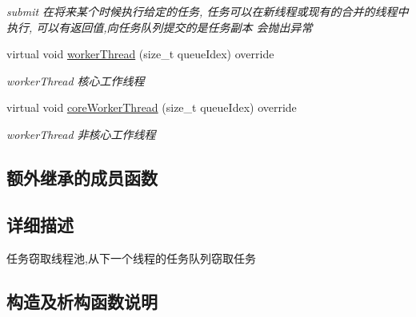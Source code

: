 \begin{DoxyCompactItemize}
\begin{DoxyCompactList}\small\item\em submit 在将来某个时候执行给定的任务, 任务可以在新线程或现有的合并的线程中执行, 可以有返回值,向任务队列提交的是任务副本 会抛出异常 \end{DoxyCompactList}\item 
virtual void \hyperlink{classWorkStealingThreadPoolExecutor_a962c0965822cd961984928ec26d61d4e}{worker\+Thread} (size\+\_\+t queue\+Idex) override
\begin{DoxyCompactList}\small\item\em worker\+Thread 核心工作线程 \end{DoxyCompactList}\item 
virtual void \hyperlink{classWorkStealingThreadPoolExecutor_a9a9ad791af26c0809a9e1864544930aa}{core\+Worker\+Thread} (size\+\_\+t queue\+Idex) override
\begin{DoxyCompactList}\small\item\em worker\+Thread 非核心工作线程 \end{DoxyCompactList}\end{DoxyCompactItemize}
\subsection*{额外继承的成员函数}


\subsection{详细描述}
任务窃取线程池,从下一个线程的任务队列窃取任务 

\subsection{构造及析构函数说明}
\mbox{\label{classWorkStealingThreadPoolExecutor_a3e4e9fd05b5b325f2f051725410525cb}} 
